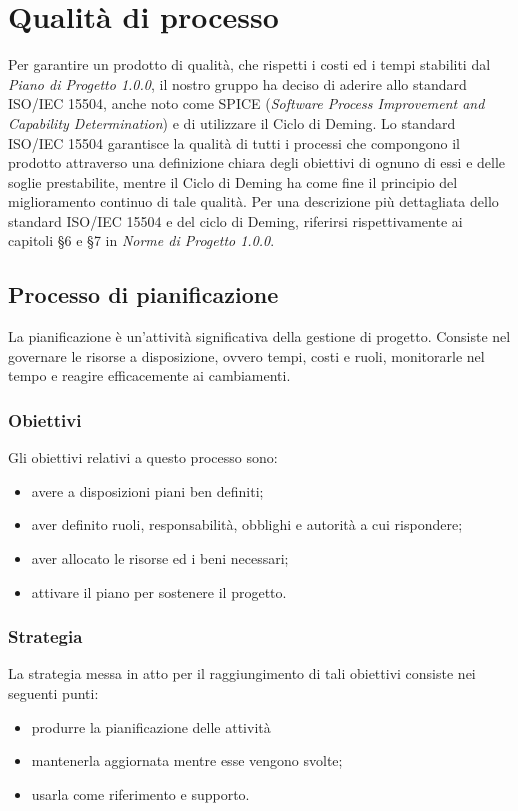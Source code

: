 \chapter{Qualità di processo}\label{2}
Per garantire un prodotto di qualità, che rispetti i costi ed i tempi stabiliti dal \textit{Piano di Progetto 1.0.0}, il nostro gruppo ha deciso di aderire allo standard ISO/IEC 15504, anche noto come SPICE (\textit{Software Process Improvement and Capability Determination}) e di utilizzare il Ciclo di Deming.
Lo standard ISO/IEC 15504 garantisce la qualità di tutti i processi che compongono il prodotto attraverso una definizione chiara degli obiettivi di ognuno di essi e delle soglie prestabilite, mentre  il Ciclo di Deming ha come fine  il principio del miglioramento continuo di tale qualità.
Per una descrizione più dettagliata dello standard ISO/IEC 15504 e del ciclo di Deming,
riferirsi rispettivamente ai capitoli §6 e §7 in \textit{Norme di Progetto 1.0.0}.
\section{Processo di pianificazione}\label{2.1}
La pianificazione è un’attività significativa della gestione di progetto. 
Consiste nel governare le risorse a disposizione, ovvero tempi, costi e ruoli, monitorarle nel tempo e reagire efficacemente ai cambiamenti. 

\subsection{Obiettivi}\label{2.1.1}
Gli obiettivi relativi a questo processo sono:
\begin{itemize}
	\item avere a disposizioni piani ben definiti;
	\item aver definito ruoli, responsabilità, obblighi e autorità a cui rispondere;
	\item aver allocato le risorse ed i beni necessari;
	\item attivare il piano per sostenere il progetto.
\end{itemize}

\subsection{Strategia}\label{2.1.2}
La strategia messa in atto per il raggiungimento di tali obiettivi consiste nei seguenti punti:
\begin{itemize}
	\item produrre la pianificazione delle attività
	\item mantenerla aggiornata mentre esse vengono svolte;
	\item usarla come riferimento e supporto.
\end{itemize}

